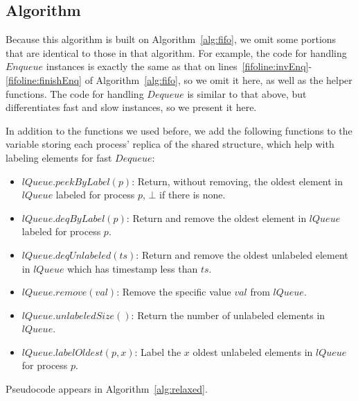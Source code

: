 \documentclass[a4paper,anonymous,USenglish]{lipics-v2021}
\theoremstyle{definition}
\begin{document}
\subsection{Algorithm}

Because this algorithm is built on Algorithm~\ref{alg:fifo}, we omit some portions that are identical to those in that algorithm.  For example, the code for handling $Enqueue$ instances is exactly the same as that on lines~\ref{fifoline:invEnq}-\ref{fifoline:finishEnq} of Algorithm~\ref{alg:fifo}, so we omit it here, as well as the helper functions.  The code for handling $Dequeue$ is similar to that above, but differentiates fast and slow instances, so we present it here. 

In addition to the functions we used before, we add the following functions to the variable storing each process' replica of the shared structure, which help with labeling elements for fast $Dequeue$:
\begin{itemize}
\item $lQueue.peekByLabel(p)$: Return, without removing, the oldest element in $lQueue$ labeled for process $p$, $\bot$ if there is none.
\item $lQueue.deqByLabel(p)$: Return and remove the oldest element in $lQueue$ labeled for process $p$.
\item $lQueue.deqUnlabeled(ts)$: Return and remove the oldest unlabeled element in $lQueue$ which has timestamp less than $ts$.
\item $lQueue.remove(val)$: Remove the specific value $val$ from $lQueue$.
\item $lQueue.unlabeledSize()$: Return the number of unlabeled elements in $lQueue$.
\item $lQueue.labelOldest(p,x)$: Label the $x$ oldest unlabeled elements in $lQueue$ for process $p$.
\end{itemize}
  Pseudocode appears in Algorithm~\ref{alg:relaxed}.
\end{document}
